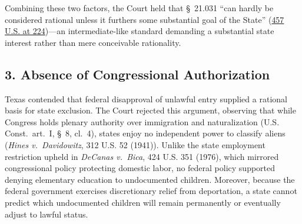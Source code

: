 \documentclass[12pt]{article}
\begin{document}
Combining these two factors, the Court held that \S~21.031 ``can hardly be considered rational unless it furthers some substantial goal of the State'' (\href{https://www.law.cornell.edu/supremecourt/text/457/202}{457 U.S. at 224})---an intermediate-like standard demanding a substantial state interest rather than mere conceivable rationality.

\subsection*{3. Absence of Congressional Authorization}
Texas contended that federal disapproval of unlawful entry supplied a rational basis for state exclusion. The Court rejected this argument, observing that while Congress holds plenary authority over immigration and naturalization (U.S. Const.\ art.\ I, \S~8, cl.\ 4), states enjoy no independent power to classify aliens (\textit{Hines v.\ Davidowitz}, 312 U.S. 52 (1941)). Unlike the state employment restriction upheld in \textit{DeCanas v.\ Bica}, 424 U.S. 351 (1976), which mirrored congressional policy protecting domestic labor, no federal policy supported denying elementary education to undocumented children. Moreover, because the federal government exercises discretionary relief from deportation, a state cannot predict which undocumented children will remain permanently or eventually adjust to lawful status.
\end{document}
